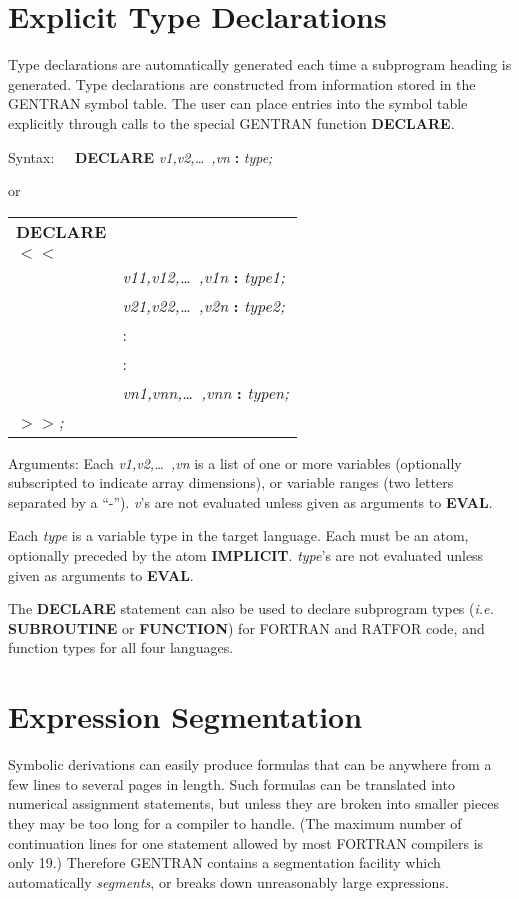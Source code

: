 \section{Explicit Type Declarations}
\label{explicit:type}
Type declarations are automatically generated each time a subprogram
heading is generated.  Type declarations are constructed
from information stored in the GENTRAN symbol table.  The user
can place entries into the symbol table explicitly through calls
to the special GENTRAN function {\bf DECLARE}.
\begin{describe}{Syntax:}
{\bf \ \ DECLARE} {\it v1,v2,\dots\  ,vn} {\bf :} {\it type;}

    or

\begin{tabular}{ll}
{\bf DECLARE}\\
{\bf $<$$<$}\\
&{\it v11,v12,\dots\  ,v1n} {\bf :} {\it type1;}\\
&{\it v21,v22,\dots\  ,v2n} {\bf :} {\it type2;}\\
& :\\
& :\\
&{\it vn1,vnn,\dots\  ,vnn} {\bf :} {\it typen;}\\
{\bf $>$$>$}{\it ;}
\end{tabular}
\end{describe}
\begin{describe}{Arguments:}
Each {\it v1,v2,\dots\  ,vn} is a list of one or more variables
(optionally subscripted to indicate array dimensions), or
variable ranges (two letters separated by a ``-'').  {\it v}'s are
not evaluated unless given as arguments to {\bf EVAL}.

Each {\it type} is a variable type in the target language.  Each
must be an atom, optionally preceded by the atom {\bf IMPLICIT}.
{\it type}'s are not evaluated unless given as arguments to {\bf EVAL}.
\end{describe}

The {\bf DECLARE} statement can also be used to declare subprogram
types ({\em i.e.\ } {\bf SUBROUTINE} or {\bf FUNCTION}) for
 FORTRAN and RATFOR code, and
function types for all four languages.

\section{Expression Segmentation}
\label{segmentation}
Symbolic derivations can easily produce formulas that can be anywhere
from a few lines to several pages in length.  Such formulas
can be translated into numerical assignment statements, but unless they
are broken into smaller pieces they may be too long for a compiler
to handle.  (The maximum number of continuation lines for one statement
allowed by most FORTRAN compilers is only 19.)  Therefore GENTRAN
contains a segmentation facility which automatically {\it segments},
or breaks down unreasonably large expressions.

